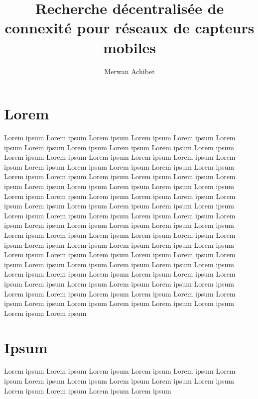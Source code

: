 \documentclass[11pt]{article}
\title{Recherche décentralisée de connexité pour réseaux de capteurs mobiles}
\author{Merwan Achibet}
\date{}
\begin{document}
\maketitle

\begin{multicols}{2}

\section{Lorem}

 Lorem ipsum  Lorem ipsum  Lorem ipsum  Lorem ipsum  Lorem ipsum
 Lorem ipsum  Lorem ipsum  Lorem ipsum  Lorem ipsum  Lorem ipsum
 Lorem ipsum  Lorem ipsum  Lorem ipsum  Lorem ipsum  Lorem ipsum
 Lorem ipsum  Lorem ipsum  Lorem ipsum  Lorem ipsum  Lorem ipsum
 Lorem ipsum  Lorem ipsum  Lorem ipsum  Lorem ipsum  Lorem ipsum
 Lorem ipsum  Lorem ipsum  Lorem ipsum  Lorem ipsum  Lorem ipsum
 Lorem ipsum  Lorem ipsum  Lorem ipsum  Lorem ipsum  Lorem ipsum
 Lorem ipsum  Lorem ipsum  Lorem ipsum  Lorem ipsum  Lorem ipsum
 Lorem ipsum  Lorem ipsum  Lorem ipsum  Lorem ipsum  Lorem ipsum
 Lorem ipsum  Lorem ipsum  Lorem ipsum  Lorem ipsum  Lorem ipsum
 Lorem ipsum  Lorem ipsum  Lorem ipsum  Lorem ipsum  Lorem ipsum
 Lorem ipsum  Lorem ipsum  Lorem ipsum  Lorem ipsum  Lorem ipsum
 Lorem ipsum  Lorem ipsum  Lorem ipsum  Lorem ipsum  Lorem ipsum
 Lorem ipsum  Lorem ipsum  Lorem ipsum  Lorem ipsum  Lorem ipsum
 Lorem ipsum  Lorem ipsum  Lorem ipsum  Lorem ipsum  Lorem ipsum
 Lorem ipsum  Lorem ipsum  Lorem ipsum  Lorem ipsum  Lorem ipsum
 Lorem ipsum  Lorem ipsum  Lorem ipsum  Lorem ipsum  Lorem ipsum
 Lorem ipsum  Lorem ipsum  Lorem ipsum  Lorem ipsum  Lorem ipsum
 Lorem ipsum  Lorem ipsum  Lorem ipsum  Lorem ipsum  Lorem ipsum
 Lorem ipsum  Lorem ipsum  Lorem ipsum  Lorem ipsum  Lorem ipsum
 Lorem ipsum

\section{Ipsum}

 Lorem ipsum  Lorem ipsum  Lorem ipsum  Lorem ipsum  Lorem ipsum
 Lorem ipsum  Lorem ipsum  Lorem ipsum  Lorem ipsum  Lorem ipsum
 Lorem ipsum  Lorem ipsum  Lorem ipsum  Lorem ipsum  Lorem ipsum
 \cite{Lafferriere2005899}
 \cite{Yang2010390}
 \cite{Cheng2011497}

\end{multicols}



\end{document}
